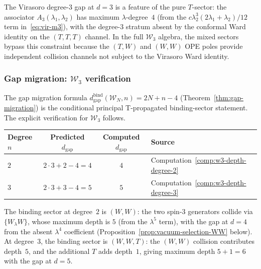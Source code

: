 \begin{remark}%
\label{rem:sector-gap-filling}%
%
The Virasoro degree-$3$ gap at $d = 3$ is a feature of the
pure $T$-sector: the associator $A_3(\lambda_1, \lambda_2)$
has maximum $\lambda$-degree~$4$ (from the $c\lambda_2^3
(2\lambda_1 + \lambda_2)/12$ term in~\eqref{eq:vir-m3}),
with the degree-$3$ stratum absent by the conformal Ward
identity on the $(T,T,T)$ channel. In the full $\mathcal{W}_3$
algebra, the mixed sectors bypass this constraint because
the $(T,W)$ and $(W,W)$ OPE poles provide independent
collision channels not subject to the Virasoro Ward identity.
\end{remark}


\subsubsection{Gap migration: $\mathcal{W}_3$ verification}
\label{subsubsec:w3-gap-migration}

The gap migration formula
$d_{\mathrm{gap}}^{\mathrm{bind}}(\mathcal{W}_N,n)=2N+n-4$
(Theorem~\ref{thm:gap-migration}) is the conditional
principal T-propagated binding-sector statement.  The explicit verification for
$\mathcal{W}_3$ follows.

\begin{computation}
\label{comp:w3-gap-migration-verification}
%
\begin{center}
\small
\renewcommand{\arraystretch}{1.3}
\begin{tabular}{lccl}
\toprule
\textbf{Degree $n$} & \textbf{Predicted
 $d_{\mathrm{gap}}$} & \textbf{Computed
 $d_{\mathrm{gap}}$} & \textbf{Source} \\
\midrule
$2$ & $2 \cdot 3 + 2 - 4 = 4$ & $4$
 & Computation~\ref{comp:w3-depth-degree-2} \\
$3$ & $2 \cdot 3 + 3 - 4 = 5$ & $5$
 & Computation~\ref{comp:w3-depth-degree-3} \\
\bottomrule
\end{tabular}
\end{center}

\noindent
The binding sector at degree~$2$ is $(W, W)$: the two
spin-$3$ generators collide via $\{W_\lambda W\}$, whose
maximum depth is $5$ (from the $\lambda^5$ term), with the
gap at $d = 4$ from the absent $\lambda^4$ coefficient
(Proposition~\ref{prop:vacuum-selection-WW} below).
At degree~$3$, the binding sector is $(W, W, T)$: the
$(W,W)$ collision contributes depth~$5$, and the
additional $T$ adds depth~$1$, giving maximum depth
$5 + 1 = 6$ with the gap at $d = 5$.
\end{computation}

